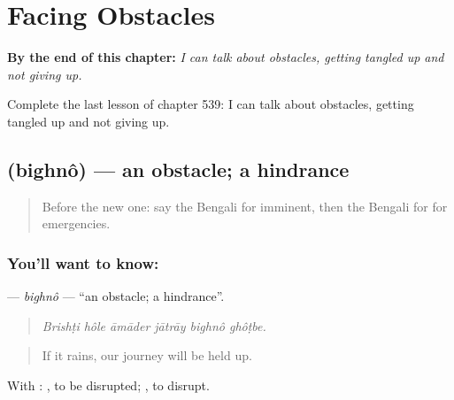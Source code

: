 
\chapter{Facing Obstacles}
\label{ch:bn-facing-obstacles}

\begin{chapteropening}
\textbf{By the end of this chapter:} \emph{I can talk about obstacles, getting tangled up and not giving up.}

Complete the last lesson of chapter 539: I can talk about obstacles, getting tangled up and not giving up.
\end{chapteropening}

\section[\texorpdfstring{\bn{বিঘ্ন} (bighnô)}{বিঘ্ন (bighnô)}]{ (bighnô) — an obstacle; a hindrance}

\label{lesson:BN-C539-bighno}



\begin{quote}
Before the new one: say the Bengali for imminent, then the Bengali for for emergencies.
\end{quote}

\subsection*{You'll want to know: }
\textbf{} — \emph{bighnô} — \textquotedblleft{}an obstacle; a hindrance\textquotedblright{}.

\begin{quote}
     
\end{quote}

\begin{quote}
\emph{Brishṭi hôle āmāder jātrāy bighnô ghôṭbe.}
\end{quote}

\begin{quote}
If it rains, our journey will be held up.
\end{quote}

With :  , to be disrupted;  , to disrupt.

